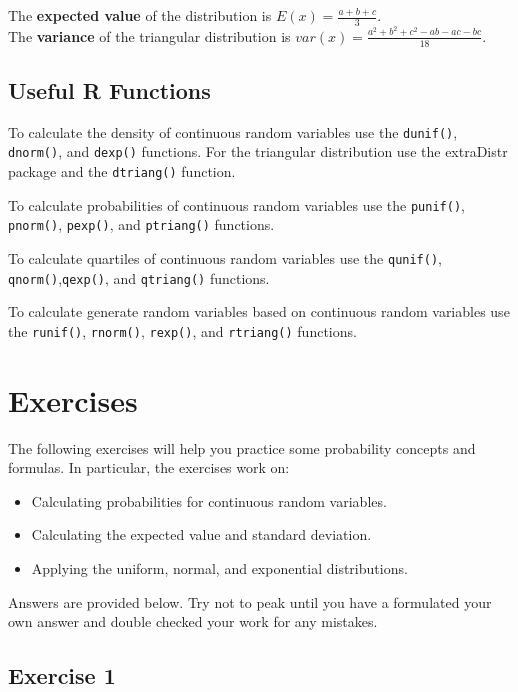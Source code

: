 \documentclass[
  letterpaper,
  DIV=11,
  numbers=noendperiod]{scrreprt}
\begin{document}
The \textbf{expected value} of the distribution is
\(E(x)= \frac {a+b+c}{3}\).\\
The \textbf{variance} of the triangular distribution is
\(var(x) = \frac {a^2+b^2+c^2-ab-ac-bc}{18}\).

\hypertarget{useful-r-functions-9}{%
\subsection*{Useful R Functions}\label{useful-r-functions-9}}

To calculate the density of continuous random variables use the
\texttt{dunif()}, \texttt{dnorm()}, and \texttt{dexp()} functions. For
the triangular distribution use the extraDistr package and the
\texttt{dtriang()} function.

To calculate probabilities of continuous random variables use the
\texttt{punif()}, \texttt{pnorm()}, \texttt{pexp()}, and
\texttt{ptriang()} functions.

To calculate quartiles of continuous random variables use the
\texttt{qunif()}, \texttt{qnorm()},\texttt{qexp()}, and
\texttt{qtriang()} functions.

To calculate generate random variables based on continuous random
variables use the \texttt{runif()}, \texttt{rnorm()}, \texttt{rexp()},
and \texttt{rtriang()} functions.

\hypertarget{exercises-9}{%
\section{Exercises}\label{exercises-9}}

The following exercises will help you practice some probability concepts
and formulas. In particular, the exercises work on:

\begin{itemize}
\item
  Calculating probabilities for continuous random variables.
\item
  Calculating the expected value and standard deviation.
\item
  Applying the uniform, normal, and exponential distributions.
\end{itemize}

Answers are provided below. Try not to peak until you have a formulated
your own answer and double checked your work for any mistakes.

\hypertarget{exercise-1-18}{%
\subsection*{Exercise 1}\label{exercise-1-18}}
\end{document}

